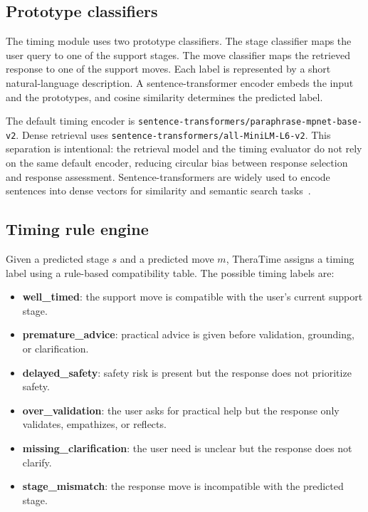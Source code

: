 \documentclass[preprint,12pt,a4paper]{elsarticle}
\begin{document}
\subsection{Prototype classifiers}

The timing module uses two prototype classifiers. The stage classifier maps the user query to one of the support stages. The move classifier maps the retrieved response to one of the support moves. Each label is represented by a short natural-language description. A sentence-transformer encoder embeds the input and the prototypes, and cosine similarity determines the predicted label.

The default timing encoder is \texttt{sentence-transformers/paraphrase-mpnet-base-v2}. Dense retrieval uses \texttt{sentence-transformers/all-MiniLM-L6-v2}. This separation is intentional: the retrieval model and the timing evaluator do not rely on the same default encoder, reducing circular bias between response selection and response assessment. Sentence-transformers are widely used to encode sentences into dense vectors for similarity and semantic search tasks~\cite{Reimers2019SentenceBERT}.

\subsection{Timing rule engine}
\label{subsec:timing_rule_engine}

Given a predicted stage \(s\) and a predicted move \(m\), TheraTime assigns a timing label using a rule-based compatibility table. The possible timing labels are:

\begin{itemize}
    \item \textbf{well\_timed}: the support move is compatible with the user's current support stage.
    \item \textbf{premature\_advice}: practical advice is given before validation, grounding, or clarification.
    \item \textbf{delayed\_safety}: safety risk is present but the response does not prioritize safety.
    \item \textbf{over\_validation}: the user asks for practical help but the response only validates, empathizes, or reflects.
    \item \textbf{missing\_clarification}: the user need is unclear but the response does not clarify.
    \item \textbf{stage\_mismatch}: the response move is incompatible with the predicted stage.
\end{itemize}
\end{document}
